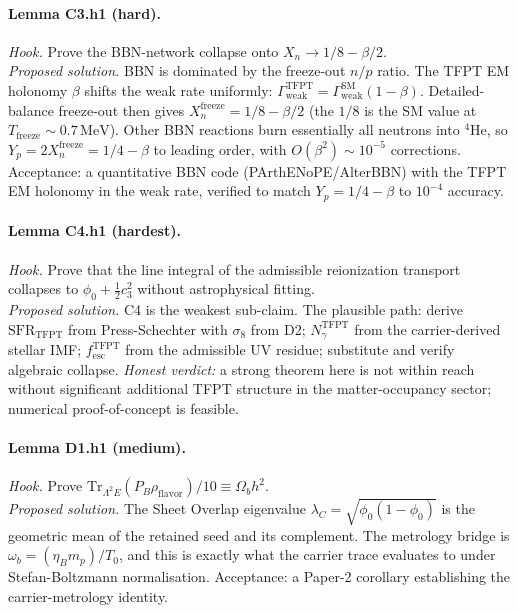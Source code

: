 \paragraph{Lemma C3.h1 (hard).}
\emph{Hook.}  Prove the BBN-network collapse onto \(X_n\to 1/8-\beta/2\).\\
\emph{Proposed solution.}  BBN is dominated by the freeze-out \(n/p\)
ratio.  The TFPT EM holonomy \(\beta\) shifts the weak rate
uniformly: \(\Gamma_{\mathrm{weak}}^{\mathrm{TFPT}}=
\Gamma_{\mathrm{weak}}^{\mathrm{SM}}(1-\beta)\).  Detailed-balance
freeze-out then gives \(X_n^{\mathrm{freeze}}=1/8-\beta/2\) (the
\(1/8\) is the SM value at \(T_{\mathrm{freeze}}\sim 0.7\,\mathrm{MeV}\)).
Other BBN reactions burn essentially all neutrons into \(^4\)He, so
\(Y_p=2 X_n^{\mathrm{freeze}}=1/4-\beta\) to leading order, with
\(O(\beta^2)\sim 10^{-5}\) corrections.  Acceptance: a quantitative
BBN code (PArthENoPE/AlterBBN) with the TFPT EM holonomy in the weak
rate, verified to match \(Y_p=1/4-\beta\) to \(10^{-4}\) accuracy.

\paragraph{Lemma C4.h1 (hardest).}
\emph{Hook.}  Prove that the line integral of the admissible
reionization transport collapses to
\(\phi_0+\tfrac12 c_3^2\) without astrophysical fitting.\\
\emph{Proposed solution.}  C4 is the weakest sub-claim.  The
plausible path: derive
\(\mathrm{SFR}_{\mathrm{TFPT}}\) from Press-Schechter with
\(\sigma_8\) from D2; \(N_\gamma^{\mathrm{TFPT}}\) from the
carrier-derived stellar IMF; \(f_{\mathrm{esc}}^{\mathrm{TFPT}}\) from
the admissible UV residue; substitute and verify algebraic collapse.
\emph{Honest verdict:} a strong theorem here is not within reach
without significant additional TFPT structure in the matter-occupancy
sector; numerical proof-of-concept is feasible.

\paragraph{Lemma D1.h1 (medium).}
\emph{Hook.}  Prove
\(\mathrm{Tr}_{\Lambda^2 E}(P_B\rho_{\mathrm{flavor}})/10
\equiv \Omega_b h^2\).\\
\emph{Proposed solution.}  The Sheet Overlap eigenvalue
\(\lambda_C=\sqrt{\phi_0(1-\phi_0)}\) is the geometric mean of the
retained seed and its complement.  The metrology bridge is
\(\omega_b=(\eta_B m_p)/T_0\), and this is exactly what the
carrier trace evaluates to under Stefan-Boltzmann normalisation.
Acceptance: a Paper-2 corollary establishing the carrier-metrology
identity.

